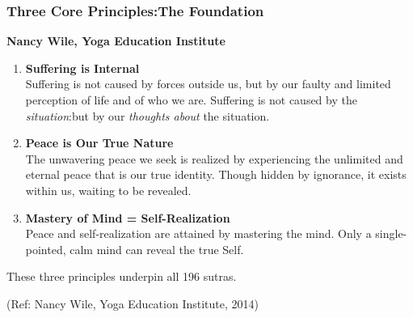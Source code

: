\begin{frame}[fragile]\frametitle{Three Core Principles:The Foundation}

\begin{center}
{\normalsize \textbf{Nancy Wile, Yoga Education Institute}}
\end{center}

\vspace{4mm}
\begin{enumerate}
\item \textbf{Suffering is Internal}\\
{\small Suffering is not caused by forces outside us, but by our faulty and limited perception of life and of who we are. Suffering is not caused by the \emph{situation}:but by our \emph{thoughts about} the situation.}

\vspace{3mm}
\item \textbf{Peace is Our True Nature}\\
{\small The unwavering peace we seek is realized by experiencing the unlimited and eternal peace that is our true identity. Though hidden by ignorance, it exists within us, waiting to be revealed.}

\vspace{3mm}
\item \textbf{Mastery of Mind = Self-Realization}\\
{\small Peace and self-realization are attained by mastering the mind. Only a single-pointed, calm mind can reveal the true Self.}
\end{enumerate}

\vspace{2mm}
\begin{center}
{\small These three principles underpin all 196 sutras.}
\end{center}

\tiny{(Ref: Nancy Wile, Yoga Education Institute, 2014)}

\end{frame}

